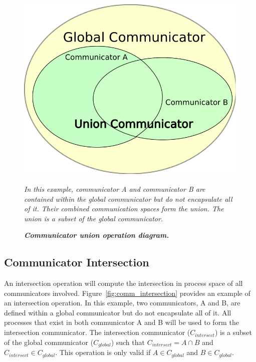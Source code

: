 \documentclass[letterpaper,12pt]{article}
\begin{document}
\begin{figure}[htpb!]
  \centering \includegraphics[width=5in]{union_comm.pdf}
  \caption{\bf \sl Communicator union operation diagram.}{\sl In this
    example, communicator A and communicator B are contained within
    the global communicator but do not encapsulate all of it. Their
    combined communication spaces form the union. The union is a
    subset of the global communicator.}
  \label{fig:comm_union}
\end{figure}

\subsection{Communicator Intersection}\label{subsec:comm_intersection}
An intersection operation will compute the intersection in process
space of all communicators
involved. Figure~\ref{fig:comm_intersection} provides an example of an
intersection operation. In this example, two communicators, A and B,
are defined within a global communicator but do not encapsulate all of
it. All processes that exist in both communicator A and B will be used
to form the intersection communicator. The intersection communicator
($C_{intersect}$) is a subset of the global communicator
($C_{global}$) such that $C_{intersect} = A \cap B$ and $C_{intersect}
\in C_{global}$. This operation is only valid if $A \in C_{global}$
and $B \in C_{global}$.
\end{document}
